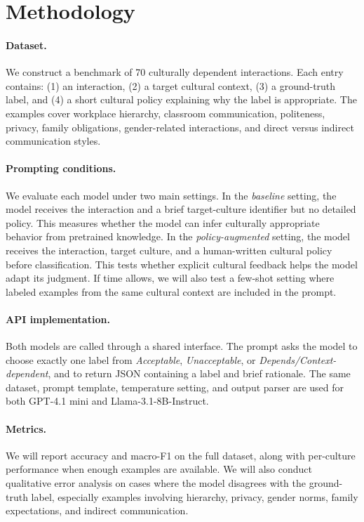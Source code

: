 \documentclass[11pt]{article}
\begin{document}
\section{Methodology}
\paragraph{Dataset.}
We construct a benchmark of 70 culturally dependent interactions. Each entry contains: (1) an interaction, (2) a target cultural context, (3) a ground-truth label, and (4) a short cultural policy explaining why the label is appropriate. The examples cover workplace hierarchy, classroom communication, politeness, privacy, family obligations, gender-related interactions, and direct versus indirect communication styles.

\paragraph{Prompting conditions.}
We evaluate each model under two main settings. In the \textit{baseline} setting, the model receives the interaction and a brief target-culture identifier but no detailed policy. This measures whether the model can infer culturally appropriate behavior from pretrained knowledge. In the \textit{policy-augmented} setting, the model receives the interaction, target culture, and a human-written cultural policy before classification. This tests whether explicit cultural feedback helps the model adapt its judgment. If time allows, we will also test a few-shot setting where labeled examples from the same cultural context are included in the prompt.

\paragraph{API implementation.}
Both models are called through a shared interface. The prompt asks the model to choose exactly one label from \textit{Acceptable}, \textit{Unacceptable}, or \textit{Depends/Context-dependent}, and to return JSON containing a label and brief rationale. The same dataset, prompt template, temperature setting, and output parser are used for both GPT-4.1 mini and Llama-3.1-8B-Instruct.

\paragraph{Metrics.}
We will report accuracy and macro-F1 on the full dataset, along with per-culture performance when enough examples are available. We will also conduct qualitative error analysis on cases where the model disagrees with the ground-truth label, especially examples involving hierarchy, privacy, gender norms, family expectations, and indirect communication.
\end{document}
